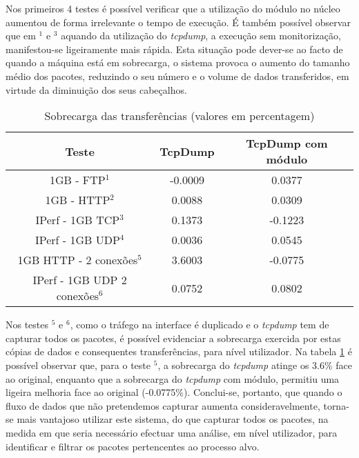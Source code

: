 Nos primeiros 4 testes é possível verificar que a utilização do módulo no núcleo aumentou de forma irrelevante o tempo de execução.
 É também possível observar que em $^{1}$ e $^{3}$ aquando da utilização do \textit{tcpdump}, a execução sem monitorização, manifestou-se ligeiramente mais rápida.
 Esta situação pode dever-se ao facto de quando a máquina está em sobrecarga, o sistema provoca o aumento do tamanho médio dos pacotes, reduzindo o seu número e o volume de dados transferidos, em virtude da diminuição dos seus cabeçalhos.

\begin{table}
\begin{center}
\caption{Sobrecarga das transferências (valores em percentagem)}
\begin{tabular}{ | c | c | c |}
\hline
Teste & \hspace {0.3cm} TcpDump \hspace {0.3cm} & TcpDump com módulo  \\

\hline
1GB - FTP$^{1}$ & -0.0009  & 0.0377  \\
1GB - HTTP$^{2}$ & 0.0088 &  0.0309   \\
IPerf - 1GB TCP$^{3}$ & 0.1373 &  -0.1223   \\
IPerf - 1GB UDP$^{4}$ & 0.0036 & 0.0545 \\
\hline
\hline
1GB HTTP - 2 conexões$^{5}$ & 3.6003 & -0.0775   \\
IPerf - 1GB UDP 2 conexões$^{6}$ & 0.0752 & 0.0802   \\
\hline
\end{tabular}
\label{tab:overhead}
\end{center}
\end{table}

Nos testes $^{5}$ e $^{6}$, como o tráfego na interface é duplicado e o \textit{tcpdump} tem de capturar todos os pacotes, é possível evidenciar a sobrecarga exercida por estas cópias de dados e consequentes transferências, para nível utilizador.
 Na tabela \ref{tab:overhead} é possível observar que, para o teste $^{5}$, a sobrecarga do \textit{tcpdump} atinge os 3.6\% face ao original, enquanto que a sobrecarga do \textit{tcpdump} com módulo, permitiu uma ligeira melhoria face ao original (-0.0775\%).
 Conclui-se, portanto, que quando o fluxo de dados que não pretendemos capturar aumenta consideravelmente, torna-se mais vantajoso utilizar este sistema, do que capturar todos os pacotes, na medida em que seria necessário efectuar uma análise, em nível utilizador, para identificar e filtrar os pacotes pertencentes ao processo alvo.

